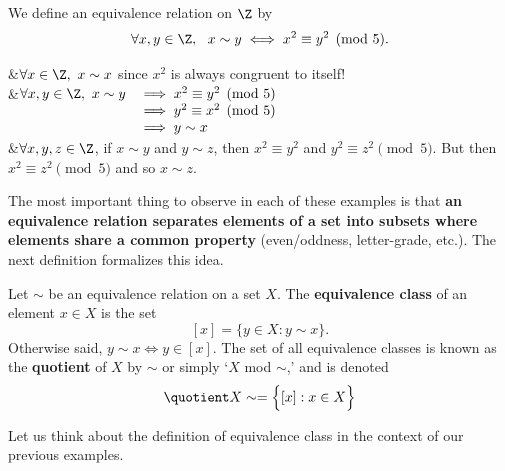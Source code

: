 \begin{examples}
	\item We define an equivalence relation on $\Z$ by
	\[\forall x,y\in\Z,\ \ x\sim y\iff x^2\equiv y^2\pmod 5.\]
		\begin{eptabular}{\trans}
		&$\forall x\in\Z,\ x\sim x$ since $x^2$ is always congruent to itself!\\
		\symm&$\begin{array}[t]{@{}rl}
		\forall x,y\in\Z,\ x\sim y&\implies x^2\equiv y^2\pmod 5\\
		&\implies y^2\equiv x^2\pmod 5\\
		&\implies y\sim x
		\end{array}$\\
		\trans&$\forall x,y,z\in\Z$, if $x\sim y$ and $y\sim z$, then $x^2\equiv y^2$ and $y^2\equiv z^2\pmod 5$. But then $x^2\equiv z^2\pmod 5$ and so $x\sim z$.
	\end{eptabular}
\end{examples}

\noindent The most important thing to observe in each of these examples is that {\bf an equivalence relation separates elements of a set into subsets where elements share a common property} (even/oddness, letter-grade, etc.). The next definition formalizes this idea.

\begin{defn}\label{defn:equivrel}
Let $\sim$ be an equivalence relation on a set $X$. The \textbf{equivalence class} of an element $x\in X$ is the set
\[[x]=\{y\in X:y\sim x\}.\]
Otherwise said, $y\sim x\iff y\in[x]$. The set of all equivalence classes is known as the \textbf{quotient} of $X$ by $\sim$ or simply `$X$ mod $\sim$,' and is denoted
\[\quotient X\sim=\Big\{[x]:x\in X\Big\}\]
\end{defn}

\noindent Let us think about the definition of equivalence class in the context of our previous examples.

